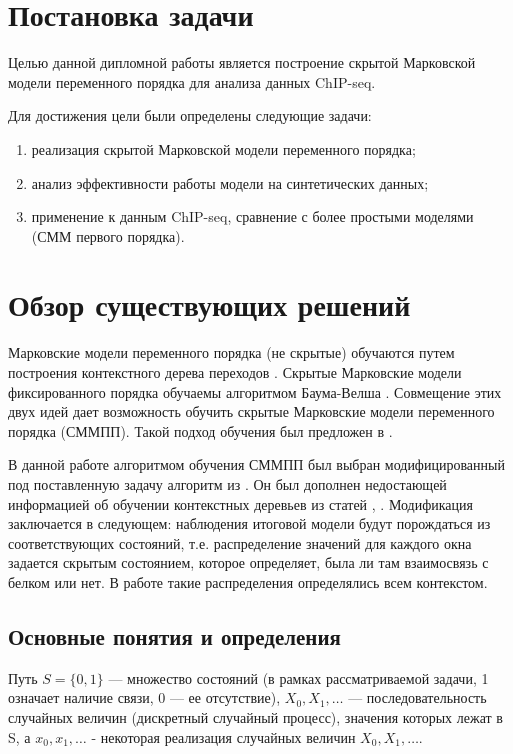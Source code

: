 \documentclass{matmex-diploma-custom}
\begin{document}
\section{Постановка задачи}
Целью данной дипломной работы является построение скрытой Марковской модели переменного
порядка для анализа данных ChIP-seq.

Для достижения цели были определены следующие задачи:
\begin{enumerate}
\item
реализация скрытой Марковской модели
переменного порядка;
\item
анализ эффективности работы модели на синтетических
данных;
\item
применение к данным ChIP-seq, сравнение с более простыми моделями (СММ
первого порядка).
\end{enumerate}


\section{Обзор существующих решений}
Марковские модели переменного порядка (не скрытые) обучаются путем построения контекстного дерева переходов \cite{Buhlmann1999}. Скрытые Марковские модели фиксированного порядка обучаемы алгоритмом Баума-Велша \cite{Rabiner1989}.
Совмещение этих двух идей дает возможность обучить скрытые Марковские модели переменного порядка (СММПП). Такой подход обучения был предложен в \cite{Wang2006}. 

В данной работе алгоритмом обучения СММПП был выбран модифицированный под поставленную задачу алгоритм  из \cite{Wang2006}. Он был дополнен недостающей информацией об обучении контекстных деревьев из статей \cite{Buhlmann1999}, \cite{Dumont2014}.
Модификация заключается в следующем: наблюдения итоговой модели будут порождаться из соответствующих состояний, т.е. распределение значений для каждого окна задается скрытым состоянием, которое определяет, была ли там взаимосвязь с белком или нет. В работе \cite{Wang2006} такие распределения определялись всем контекстом. 

\subsection{Основные понятия и определения}

Путь 
$ S = \{0, 1\} $ --- множество состояний (в рамках рассматриваемой задачи, 1 означает наличие связи, 0 --- ее отсутствие), 
$X_0, X_1, \ldots $ --- последовательность случайных величин (дискретный случайный процесс), значения которых лежат в S, а
$x_0, x_1, \ldots$ - некоторая реализация случайных величин $X_0, X_1, \ldots $.
\end{document}
